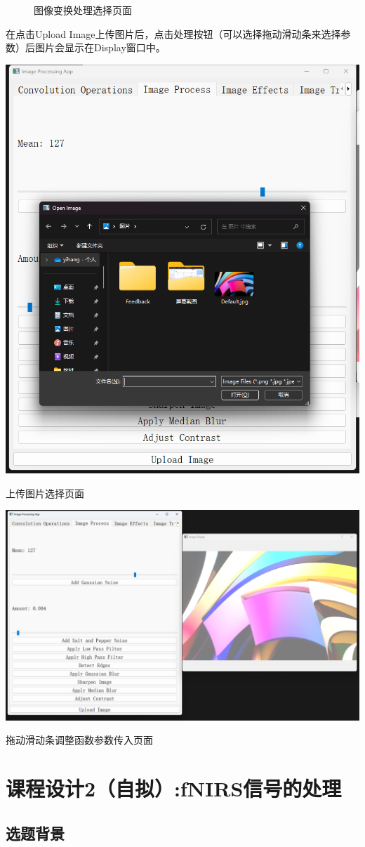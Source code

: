 \documentclass[a4paper,12pt]{article}
\begin{document}
\begin{figure}[htbp]
\begin{minipage}[b]{0.48\textwidth}
        \caption{图像变换处理选择页面}
    \end{minipage}
\end{figure}

\clearpage
在点击Upload Image上传图片后，点击处理按钮（可以选择拖动滑动条来选择参数）后图片会显示在Display窗口中。
\vspace{1cm}

\centering
\includegraphics[width=0.6\linewidth]{images/Design/image_processing/GUI/Upload.png}
\caption{上传图片选择页面}


\includegraphics[width=0.8\linewidth]{images/Design/image_processing/GUI/para.png}
\caption{拖动滑动条调整函数参数传入页面}

\justifying

\newpage
\section{课程设计2（自拟）:fNIRS信号的处理}
\subsection{选题背景}
\end{document}
